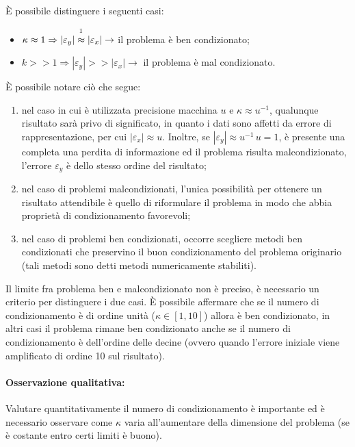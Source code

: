 È possibile distinguere i seguenti casi:
\begin{itemize}
    \item $\kappa\approx 1\Rightarrow |\varepsilon_y|\overset{\footnotemark}{\approx}|\varepsilon_x|\rightarrow$ il problema è ben condizionato;
    \item $k>>1\Rightarrow |\varepsilon_y|>>|\varepsilon_x|\rightarrow$ il problema è mal condizionato.
\end{itemize}


È possibile notare ciò che segue:
\begin{enumerate}
    \item nel caso in cui è utilizzata precisione macchina $u$ e $\kappa\approx u^{-1}$, qualunque risultato sarà privo di significato, in quanto i dati sono affetti da errore di rappresentazione, per cui $|\varepsilon_x|\approx u$. Inoltre, se $|\varepsilon_y|\approx u^{-1}\,u=1$, è presente una completa una perdita di informazione ed il problema risulta malcondizionato, l'errore $\varepsilon_y$ è dello stesso ordine del risultato;
    \item nel caso di problemi malcondizionati, l'unica possibilità per ottenere un risultato attendibile è quello di riformulare il problema in modo che abbia proprietà di condizionamento favorevoli;
    \item nel caso di problemi ben condizionati, occorre scegliere metodi ben condizionati che preservino il buon condizionamento del problema originario (tali metodi sono detti metodi numericamente stabiliti).
\end{enumerate}

Il limite fra problema ben e malcondizionato non è preciso, è necessario un criterio per distinguere i due casi. È possibile affermare che se il numero di condizionamento è di ordine unità ($\kappa\in[1,10]$) allora è ben condizionato, in altri casi il problema rimane ben condizionato anche se il numero di condizionamento è dell'ordine delle decine (ovvero quando l'errore iniziale viene amplificato di ordine 10 sul risultato).

\paragraph{Osservazione qualitativa:} Valutare quantitativamente il numero di condizionamento è importante ed è necessario osservare come $\kappa$ varia all'aumentare della dimensione del problema (se è costante entro certi limiti è buono).

